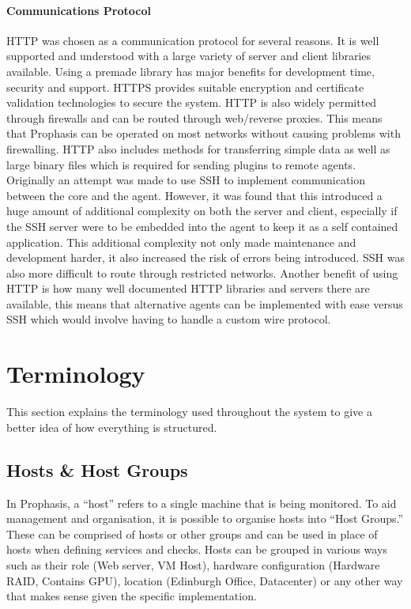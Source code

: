 \documentclass[bsc,logo,twoside,parskip,singlespacing,notimes]{infthesis}
\begin{document}
\paragraph*{Communications Protocol}
	HTTP was chosen as a communication protocol for several reasons.  It is well
	supported and understood with a large variety of server and client libraries
	available.  Using a premade library has major benefits for development time,
	security and support. HTTPS provides suitable encryption and certificate
	validation technologies to secure the system. HTTP is also widely permitted
	through firewalls and can be routed through web/reverse proxies.  This means
	that Prophasis can be operated on most networks without causing problems with
	firewalling.  HTTP also includes methods for transferring simple data as well
	as large binary files which is required for sending plugins to remote agents.
	Originally an attempt was made to use SSH to implement communication between
	the core and the agent.  However, it was found that this introduced a huge
	amount of additional complexity on both the server and client, especially if
	the SSH server were to be embedded into the agent to keep it as a self
	contained application.  This additional complexity not only made maintenance
	and development harder, it also increased the risk of errors being introduced.
	SSH was also more difficult to route through restricted networks.  Another
	benefit of using HTTP is how many well documented HTTP libraries and servers
	there are available, this means that alternative agents can be implemented with
	ease versus SSH which would involve having to handle a custom wire protocol.

\section{Terminology}

	This section explains the terminology used throughout the system to give a
	better idea of how everything is structured.

\subsection{Hosts \& Host Groups}

	In Prophasis, a ``host'' refers to a single machine that is being monitored. To
	aid management and organisation, it is possible to organise hosts into ``Host
	Groups.''  These can be comprised of hosts or other groups and can be used in
	place of hosts when defining services and checks.  Hosts can be grouped in
	various ways such as their role (Web server, VM Host), hardware configuration
	(Hardware RAID, Contains GPU), location (Edinburgh Office, Datacenter) or any
	other way that makes sense given the specific implementation.
\end{document}
